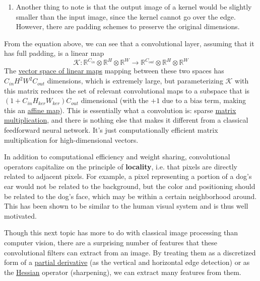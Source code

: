 \begin{definition}
\begin{enumerate}
      \item Another thing to note is that the output image of a kernel would be slightly smaller than the input image, since the kernel cannot go over the edge. However, there are padding schemes to preserve the original dimensions. 
    \end{enumerate}
    From the equation above, we can see that a convolutional layer, assuming that it has full padding, is a linear map  
    \begin{equation}
      \mathcal{K} : \mathbb{R}^{C_{in}} \otimes \mathbb{R}^H \otimes \mathbb{R}^W \rightarrow \mathbb{R}^{C_{out}} \otimes \mathbb{R}^H \otimes \mathbb{R}^W
      \label{eq:conv_mapping}
    \end{equation}
    The \hyperref[lin-thm:vector-space-of-linear-maps]{vector space of linear maps} mapping between these two spaces has $C_{in} H^2 W^2 C_{out}$ dimensions, which is extremely large, but parameterizing $\mathcal{K}$ with this matrix reduces the set of relevant convolutional maps to a subspace that is $(1 + C_{in} H_{ker} W_{ker}) C_{out}$ dimensional (with the $+1$ due to a bias term, making this an \hyperref[alg-def:affine-map]{affine map}). This is essentially what a convolution is: sparse \hyperref[lin-def:matrix-multiplication]{matrix multiplication}, and there is nothing else that makes it different from a classical feedforward neural network. It's just computationally efficient matrix multiplication for high-dimensional vectors. 
  \end{definition}

  In addition to computational efficiency and weight sharing, convolutional operators capitalize on the principle of \textbf{locality}, i.e. that pixels are directly related to adjacent pixels. For example, a pixel representing a portion of a dog's ear would not be related to the background, but the color and positioning should be related to the dog's face, which may be within a certain neighborhood around. This has been shown to be similar to the human visual system and is thus well motivated. 

  Though this next topic has more to do with classical image processing than computer vision, there are a surprising number of features that these convolutional filters can extract from an image. By treating them as a discretized form of a \hyperref[mv-def:partial-derivative]{partial derivative} (as the vertical and horizontal edge detection) or as the \hyperref[mv-def:hessian]{Hessian} operator (sharpening), we can extract many features from them.  

